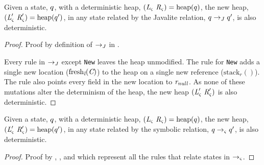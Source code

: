 \begin{lemma}
\label{lem:J-determ}
Given a state, $q$, with a deterministic heap,
$(\emph{L}_{\varsigma}\ \emph{R}_{\varsigma}) =
\mathrm{heap}(q)$, the new heap,
$(\emph{L}_{\varsigma}^\prime\ \emph{R}_{\varsigma}^\prime) =
\mathrm{heap}(q^\prime)$, in any state related by the
Javalite relation, $q \rightarrow_{J} q^\prime$, is
also deterministic.
\end{lemma}
\begin{proof}
Proof by definition of $\rightarrow_{J}$ in .

Every rule in $\rightarrow_{J}$ except \texttt{New} leaves the heap
unmodified. The rule for \texttt{New} adds a single new location
($\mathrm{fresh}_{\emph{l}}(\emph{C})$) to the heap on a single new
reference ($\mathrm{stack}_r()$). The rule also points every field in
the new location to $\emph{r}_\mathit{null}$. As none of these
mutations alter the determinism of the heap, the new heap
$(\cfgnt{L}_\sym^\prime\ \cfgnt{R}_\sym^\prime)$ is also
deterministic.
\end{proof}

\begin{theorem}
\label{thm:determ}
Given a state, $q$, with a deterministic heap,
$(\emph{L}_{\varsigma}\ \emph{R}_{\varsigma}) =
\mathrm{heap}(q)$, the new heap,
$(\emph{L}_{\varsigma}^\prime\ \emph{R}_{\varsigma}^\prime) =
\mathrm{heap}(q^\prime)$, in any state related by the
symbolic relation, $q \rightarrow_{\varsigma} q^\prime$, is
also deterministic.
\end{theorem}
\begin{proof}
Proof by , , and 
which represent all the rules that relate states in
$\rightarrow_{\varsigma}$.
\end{proof}



